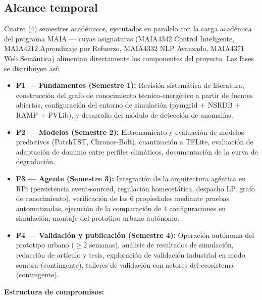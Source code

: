 \documentclass[12pt,letterpaper]{article}
\begin{document}
\subsection*{Alcance temporal}

Cuatro (4) semestres acad\'emicos, ejecutados en paralelo con la carga acad\'emica del programa MAIA --- cuyas asignaturas (MAIA4342 Control Inteligente, MAIA4212 Aprendizaje por Refuerzo, MAIA4332 NLP Avanzado, MAIA4371 Web Sem\'antica) alimentan directamente los componentes del proyecto. Las fases se distribuyen as\'i:

\begin{itemize}
\item \textbf{F1 --- Fundamentos (Semestre 1):} Revisi\'on sistem\'atica de literatura, construcci\'on del grafo de conocimiento t\'ecnico-energ\'etico a partir de fuentes abiertas, configuraci\'on del entorno de simulaci\'on (pymgrid + NSRDB + RAMP + PVLib), y desarrollo del m\'odulo de detecci\'on de anomal\'ias.
\item \textbf{F2 --- Modelos (Semestre 2):} Entrenamiento y evaluaci\'on de modelos predictivos (PatchTST, Chronos-Bolt), cuantizaci\'on a TFLite, evaluaci\'on de adaptaci\'on de dominio entre perfiles clim\'aticos, documentaci\'on de la curva de degradaci\'on.
\item \textbf{F3 --- Agente (Semestre 3):} Integraci\'on de la arquitectura ag\'entica en RPi (persistencia event-sourced, regulaci\'on homeost\'atica, despacho LP, grafo de conocimiento), verificaci\'on de las 6 propiedades mediante pruebas automatizadas, ejecuci\'on de la comparaci\'on de 4 configuraciones en simulaci\'on, montaje del prototipo urbano aut\'onomo.
\item \textbf{F4 --- Validaci\'on y publicaci\'on (Semestre 4):} Operaci\'on aut\'onoma del prototipo urbano ($\geq$2 semanas), an\'alisis de resultados de simulaci\'on, redacci\'on de art\'iculo y tesis, exploraci\'on de validaci\'on industrial en modo sombra (contingente), talleres de validaci\'on con actores del ecosistema (contingente).
\end{itemize}

\textbf{Estructura de compromisos:}
\end{document}
